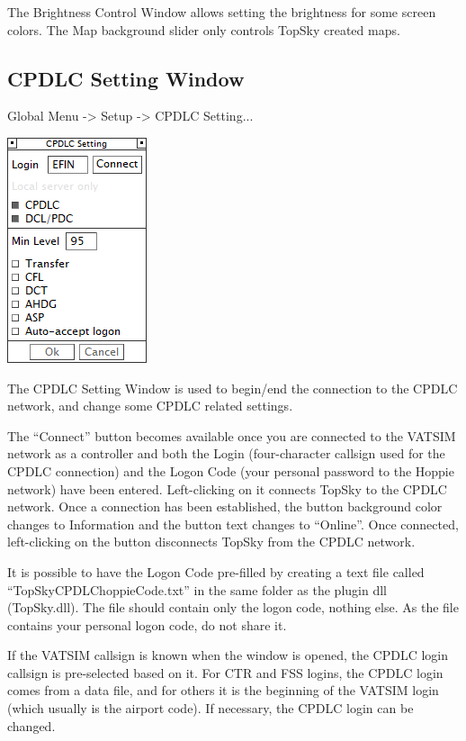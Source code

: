 \documentclass[11pt,a4paper,oldfontcommands]{memoir}
\newenvironment{Note}
  {\begin{shaded}\marginnote{\fbox{Note}}}
  {\end{shaded}}
\begin{document}
The Brightness Control Window allows setting the brightness for some screen colors. The Map background slider only controls TopSky created maps.

\subsection{CPDLC Setting Window}
\label{win:dls}

Global Menu -> Setup -> CPDLC Setting...

\includegraphics{img/dlsetup.png}

The CPDLC Setting Window is used to begin/end the connection to the CPDLC network, and change some CPDLC related settings.

The “Connect” button becomes available once you are connected to the VATSIM network as a controller and both the Login (four-character callsign used for the CPDLC connection) and the Logon Code (your personal password to the Hoppie network) have been entered. Left-clicking on it connects TopSky to the CPDLC network. Once a connection has been established, the button background color changes to Information and the button text changes to “Online”. Once connected, left-clicking on the button disconnects TopSky from the CPDLC network.

\begin{Note}
    It is possible to have the Logon Code pre-filled by creating a text file called “TopSkyCPDLChoppieCode.txt” in the same folder as the plugin dll (TopSky.dll). The file should contain only the logon code, nothing else. As the file contains your personal logon code, do not share it.
\end{Note}

If the VATSIM callsign is known when the window is opened, the CPDLC login callsign is pre-selected based on it. For CTR and FSS logins, the CPDLC login comes from a data file, and for others it is the beginning of the VATSIM login (which usually is the airport code). If necessary, the CPDLC login can be changed.
\end{document}
